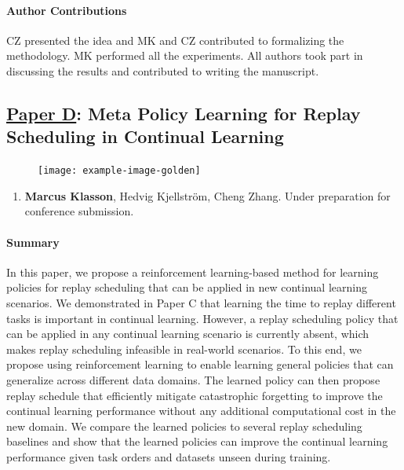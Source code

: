 \paragraph{Author Contributions} 
CZ presented the idea and MK and CZ contributed to formalizing the methodology. 
MK performed all the experiments. 
All authors took part in discussing the results and contributed to writing the manuscript. 


\subsection{\underline{Paper D}: Meta Policy Learning for Replay Scheduling in Continual Learning}
\label{sec:paperD}

\begin{figure}[h]
	\centering 
	\texttt{[image: example-image-golden]}
	\caption{ }
	\label{fig:paperD}
\end{figure}

\begin{enumerate}
	\item[] \textbf{Marcus Klasson}, Hedvig Kjellström, Cheng Zhang. Under preparation for conference submission.
\end{enumerate}



\paragraph{Summary} 
In this paper, we propose a reinforcement learning-based method for learning policies for replay scheduling that can be applied in new continual learning scenarios. We demonstrated in Paper C that learning the time to replay different tasks is important in continual learning. However, a replay scheduling policy that can be applied in any continual learning scenario is currently absent, which makes replay scheduling infeasible in real-world scenarios. To this end, we propose using reinforcement learning to enable learning general policies that can generalize across different data domains. 
The learned policy can then propose replay schedule that efficiently mitigate catastrophic forgetting to improve the continual learning performance without any additional computational cost in the new domain. We compare the learned policies to several replay scheduling baselines and show that the learned policies can improve the continual learning performance given task orders and datasets unseen during training. 


